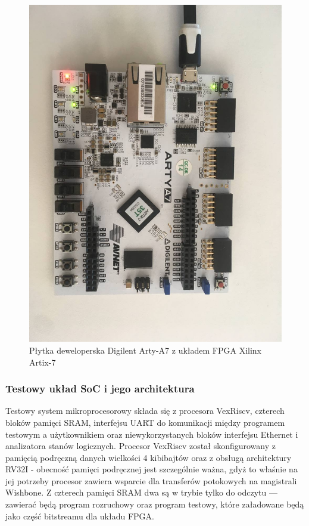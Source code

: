 \begin{figure}[H]
	\centering
	\includegraphics[angle=90,scale=0.3,trim={3cm 0 6cm 0},clip]{testing/photo_2022-09-16_13-47-42.jpg}
	\caption{Płytka deweloperska Digilent Arty-A7 z układem FPGA Xilinx Artix-7}
	\label{fig:arty-a7-photo}
\end{figure}

\subsubsection{Testowy układ SoC i jego architektura}

Testowy system mikroprocesorowy składa się z procesora VexRiscv, czterech bloków pamięci SRAM, interfejsu UART do komunikacji między programem testowym a użytkownikiem oraz niewykorzystanych bloków interfejsu Ethernet i analizatora stanów logicznych.
Procesor VexRiscv został skonfigurowany z pamięcią podręczną danych wielkości 4 kibibajtów oraz z obsługą architektury RV32I - obecność pamięci podręcznej jest szczególnie ważna, gdyż to właśnie na jej potrzeby procesor zawiera wsparcie dla transferów potokowych na magistrali Wishbone.
Z czterech pamięci SRAM dwa są w trybie tylko do odczytu --- zawierać będą program rozruchowy oraz program testowy, które załadowane będą jako część bitstreamu dla układu FPGA.

